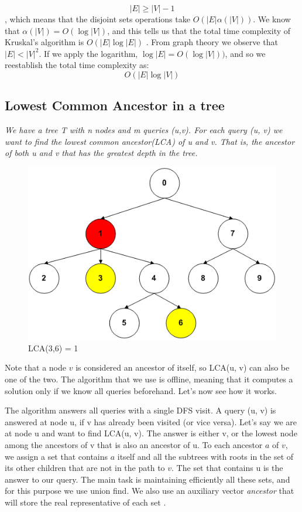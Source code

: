 \documentclass{article}
\begin{document}
 $$|E| \geq |V| - 1$$, which means that the disjoint sets operations take $O(|E|\alpha(|V|))$. We know that
 $\alpha(|V|) = O(\log|V|)$, and this tells us that the total time complexity of Kruskal's algorithm
 is $O(|E|\log|E|)$ \cite{cormen2009introduction}. From graph theory we observe that $|E| < |V|^2$. If we apply the logarithm,
 $\log|E| = O(\log|V|))$, and so we reestablish the total time complexity as:
 $$O(|E|\log|V|)$$


\subsection{Lowest Common Ancestor in a tree}
\emph{We have a tree T with  n nodes and m queries (u,v). For each query (u, v) we want to find
the lowest common ancestor(LCA) of u and v. That is, the ancestor of both u and v that has the greatest depth in the tree.
}
\begin{figure}[h!]
    \centering
    \includegraphics[scale = 0.5]{img/lca1.png}
    \caption{LCA(3,6) = 1}
\end{figure}

 \bigskip
 Note that a node $v$ is considered an ancestor of itself, so LCA(u, v) can also be one of the two.
 The algorithm that we use is offline, meaning that it computes a solution only if we know
 all queries beforehand. Let's now see how it works. 
 
 \medskip
 The algorithm answers all queries
 with a single DFS visit. A query (u, v) is answered at node u, if v has already been visited
 (or vice versa). Let's say we are at node u and want to find LCA(u, v). The answer is either v, or the lowest node among
the ancestors of v that is also an ancestor of u. To each ancestor $a$  of $v$, we assign a set
that contains $a$ itself and all the subtrees with roots in the set of its other children
that are not in the path to $v$. The set that contains u is the answer to our query. The main task is maintaining
efficiently all these sets, and for this purpose we use union find. We also use an auxiliary vector \emph{ancestor} that
will store the real representative of each set \cite{cp}.
\end{document}
